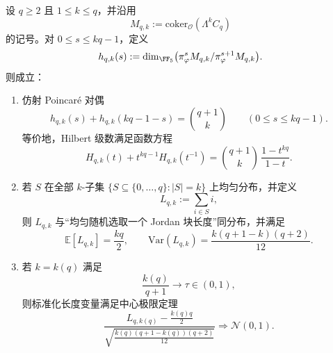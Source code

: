 \begin{theorem}\label{thm:xi-exterior-power-jordan-affine-poincare-clt}
设 \(q\ge 2\) 且 \(1\le k\le q\)，并沿用
\[
M_{q,k}:=\mathrm{coker}_{\mathcal O}(\Lambda^k C_q)
\]
的记号。对 \(0\le s\le kq-1\)，定义
\[
h_{q,k}(s):=\dim_{\FF_5}\bigl(\pi_\varphi^{s}M_{q,k}/\pi_\varphi^{s+1}M_{q,k}\bigr).
\]
则成立：
\begin{enumerate}
  \item 仿射 Poincar\'e 对偶
  \[
  \boxed{\;
  h_{q,k}(s)+h_{q,k}(kq-1-s)=\binom{q+1}{k}
  \qquad(0\le s\le kq-1).\;}
  \]
  等价地，Hilbert 级数满足函数方程
  \[
  \boxed{\;
  H_{q,k}(t)+t^{kq-1}H_{q,k}(t^{-1})
  =
  \binom{q+1}{k}\,\frac{1-t^{kq}}{1-t}.\;}
  \]

  \item 若 \(S\) 在全部 \(k\)-子集
  \(
  \{S\subseteq\{0,\dots,q\}:|S|=k\}
  \)
  上均匀分布，并定义
  \[
  L_{q,k}:=\sum_{i\in S} i,
  \]
  则 \(L_{q,k}\) 与“均匀随机选取一个 Jordan 块长度”同分布，并满足
  \[
  \boxed{\;
  \mathbb E[L_{q,k}]=\frac{kq}{2},
  \qquad
  \mathrm{Var}(L_{q,k})=\frac{k(q+1-k)(q+2)}{12}.\;}
  \]

  \item 若 \(k=k(q)\) 满足
  \[
  \frac{k(q)}{q+1}\longrightarrow \tau\in(0,1),
  \]
  则标准化长度变量满足中心极限定理
  \[
  \boxed{\;
  \frac{L_{q,k(q)}-\frac{k(q)q}{2}}
  {\sqrt{\frac{k(q)(q+1-k(q))(q+2)}{12}}}
  \Longrightarrow \mathcal N(0,1).\;}
  \]
\end{enumerate}
\end{theorem}
